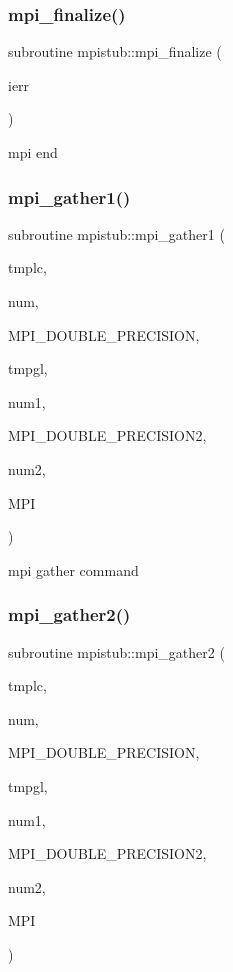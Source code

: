 \subsubsection{\texorpdfstring{mpi\_finalize()}{mpi\_finalize()}}
{\footnotesize\ttfamily subroutine mpistub\+::mpi\+\_\+finalize (\begin{DoxyParamCaption}\item[{}]{ierr }\end{DoxyParamCaption})}



mpi end 

\mbox{\label{namespacempistub_a3e61dfb24d3caebd2c2983a9e4ab3dfd}} 
\subsubsection{\texorpdfstring{mpi\_gather1()}{mpi\_gather1()}}
{\footnotesize\ttfamily subroutine mpistub\+::mpi\+\_\+gather1 (\begin{DoxyParamCaption}\item[{double precision, dimension(\+:)}]{tmplc,  }\item[{}]{num,  }\item[{}]{M\+P\+I\+\_\+\+D\+O\+U\+B\+L\+E\+\_\+\+P\+R\+E\+C\+I\+S\+I\+ON,  }\item[{double precision, dimension(\+:)}]{tmpgl,  }\item[{}]{num1,  }\item[{}]{M\+P\+I\+\_\+\+D\+O\+U\+B\+L\+E\+\_\+\+P\+R\+E\+C\+I\+S\+I\+O\+N2,  }\item[{}]{num2,  }\item[{}]{M\+PI }\end{DoxyParamCaption})}



mpi gather command 

\mbox{\label{namespacempistub_a9be56b07b004daadf8c9baeb3f79a9eb}} 
\subsubsection{\texorpdfstring{mpi\_gather2()}{mpi\_gather2()}}
{\footnotesize\ttfamily subroutine mpistub\+::mpi\+\_\+gather2 (\begin{DoxyParamCaption}\item[{double precision}]{tmplc,  }\item[{}]{num,  }\item[{}]{M\+P\+I\+\_\+\+D\+O\+U\+B\+L\+E\+\_\+\+P\+R\+E\+C\+I\+S\+I\+ON,  }\item[{double precision, dimension(\+:)}]{tmpgl,  }\item[{}]{num1,  }\item[{}]{M\+P\+I\+\_\+\+D\+O\+U\+B\+L\+E\+\_\+\+P\+R\+E\+C\+I\+S\+I\+O\+N2,  }\item[{}]{num2,  }\item[{}]{M\+PI }\end{DoxyParamCaption})}

